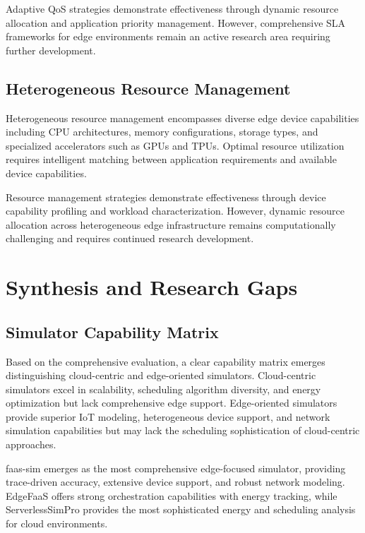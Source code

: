 Adaptive QoS strategies demonstrate effectiveness through dynamic resource allocation and application priority management. However, comprehensive SLA frameworks for edge environments remain an active research area requiring further development.

\subsection{Heterogeneous Resource Management}

Heterogeneous resource management encompasses diverse edge device capabilities including CPU architectures, memory configurations, storage types, and specialized accelerators such as GPUs and TPUs. Optimal resource utilization requires intelligent matching between application requirements and available device capabilities.

Resource management strategies demonstrate effectiveness through device capability profiling and workload characterization. However, dynamic resource allocation across heterogeneous edge infrastructure remains computationally challenging and requires continued research development.

\section{Synthesis and Research Gaps}

\subsection{Simulator Capability Matrix}

Based on the comprehensive evaluation, a clear capability matrix emerges distinguishing cloud-centric and edge-oriented simulators. Cloud-centric simulators excel in scalability, scheduling algorithm diversity, and energy optimization but lack comprehensive edge support. Edge-oriented simulators provide superior IoT modeling, heterogeneous device support, and network simulation capabilities but may lack the scheduling sophistication of cloud-centric approaches.

faas-sim emerges as the most comprehensive edge-focused simulator, providing trace-driven accuracy, extensive device support, and robust network modeling. EdgeFaaS offers strong orchestration capabilities with energy tracking, while ServerlessSimPro provides the most sophisticated energy and scheduling analysis for cloud environments.

